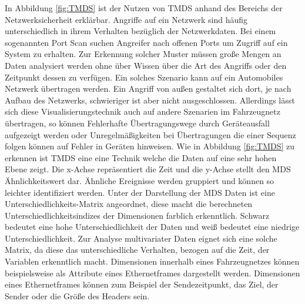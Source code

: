 \documentclass[draft=false
              ,paper=a4
              ,twoside=false
              ,fontsize=11pt
              ,headsepline
              ,BCOR10mm
              ,DIV11
              ]{scrbook}
\begin{document}
In Abbildung \ref{fig:TMDS} ist der Nutzen von TMDS anhand des Bereichs der Netzwerksicherheit erklärbar. Angriffe auf ein Netzwerk sind häufig unterschiedlich in ihrem Verhalten bezüglich der Netzwerkdaten. Bei einem sogenannten Port Scan suchen Angreifer nach offenen Ports um Zugriff auf ein System zu erhalten. Zur Erkennung solcher Muster müssen große Mengen an Daten analysiert werden ohne über Wissen über die Art des Angriffs oder den Zeitpunkt dessen zu verfügen. Ein solches Szenario kann auf ein Automobiles Netzwerk übertragen werden. Ein Angriff von außen gestaltet sich dort, je nach Aufbau des Netzwerks, schwieriger ist aber nicht ausgeschlossen. Allerdings lässt sich diese Visualisierungstechnik auch auf andere Szenarien im Fahrzeugnetz übertragen, so können Fehlerhafte Übertragungswege durch Geräteausfall aufgezeigt werden oder Unregelmäßigkeiten bei Übertragungen die einer Sequenz folgen können auf Fehler in Geräten hinweisen. Wie in Abbildung \ref{fig:TMDS} zu erkennen ist TMDS eine eine Technik welche die Daten auf eine sehr hohen Ebene zeigt. Die x-Achse repräsentiert die Zeit und die y-Achse stellt den MDS Ähnlichkeitswert dar. Ähnliche Ereignisse werden gruppiert und können so leichter identifiziert werden. Unter der Darstellung der MDS Daten ist eine Unterschiedlichkeits-Matrix angeordnet, diese macht die berechneten Unterschiedlichkeitsindizes der Dimensionen farblich erkenntlich. Schwarz bedeutet eine hohe Unterschiedlichkeit der Daten und weiß bedeutet eine niedrige Unterschiedlichkeit. Zur Analyse multivariater Daten eignet sich eine solche Matrix, da diese das unterschiedliche Verhalten, bezogen auf die Zeit, der Variablen erkenntlich macht.  Dimensionen innerhalb eines Fahrzeugnetzes können beispielsweise als Attribute eines Ethernetframes dargestellt werden. Dimensionen eines Ethernetframes können zum Beispiel der Sendezeitpunkt, das Ziel, der Sender oder die Größe des Headers sein.
\end{document}
